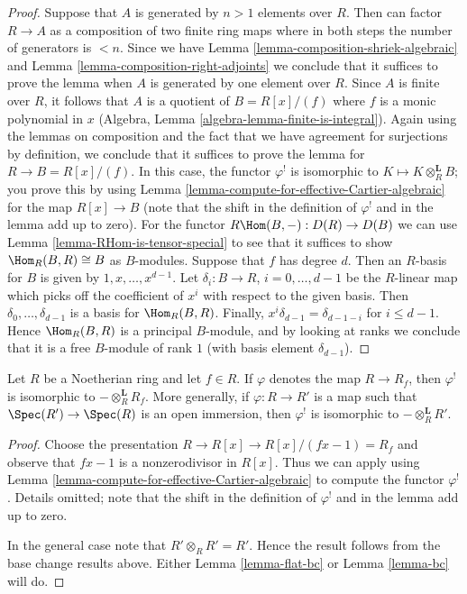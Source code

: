 \begin{proof}
Suppose that $A$ is generated by $n > 1$ elements over $R$.
Then can factor $R \to A$ as a composition of two finite ring maps
where in both steps the number of generators is $< n$.
Since we have Lemma \ref{lemma-composition-shriek-algebraic} and
Lemma \ref{lemma-composition-right-adjoints}
we conclude that it suffices
to prove the lemma when $A$ is generated by one element over $R$.
Since $A$ is finite over $R$, it follows that $A$ is a quotient
of $B = R[x]/(f)$ where $f$ is a monic polynomial in $x$
(Algebra, Lemma \ref{algebra-lemma-finite-is-integral}).
Again using the lemmas on composition and the fact that we
have agreement for surjections by definition, we conclude that
it suffices to prove the lemma for $R \to B = R[x]/(f)$.
In this case, the functor $\varphi^!$ is isomorphic to
$K \mapsto K \otimes_R^\mathbf{L} B$; you prove this by
using Lemma \ref{lemma-compute-for-effective-Cartier-algebraic}
for the map $R[x] \to B$ (note that the shift in the definition
of $\varphi^!$ and in the lemma add up to zero).
For the functor $R\Hom(B, -) : D(R) \to D(B)$ we can use
Lemma \ref{lemma-RHom-is-tensor-special}
to see that it suffices to show $\Hom_R(B, R) \cong B$
as $B$-modules. Suppose that $f$ has degree $d$.
Then an $R$-basis for $B$ is given by $1, x, \ldots, x^{d - 1}$.
Let $\delta_i : B \to R$, $i = 0, \ldots, d - 1$
be the $R$-linear map which picks off the coefficient
of $x^i$ with respect to the given basis. Then
$\delta_0, \ldots, \delta_{d - 1}$ is a basis for $\Hom_R(B, R)$.
Finally, $x^i \delta_{d - 1} = \delta_{d - 1 - i}$ for $i \leq d - 1$.
Hence $\Hom_R(B, R)$ is a principal $B$-module, and by looking
at ranks we conclude that it is a free $B$-module of rank $1$
(with basis element $\delta_{d - 1}$).
\end{proof}

\begin{lemma}
\label{lemma-upper-shriek-localize}
Let $R$ be a Noetherian ring and let $f \in R$.
If $\varphi$ denotes the map $R \to R_f$, then $\varphi^!$
is isomorphic to $- \otimes_R^\mathbf{L} R_f$.
More generally, if $\varphi : R \to R'$ is a map such that
$\Spec(R') \to \Spec(R)$ is an open immersion, then
$\varphi^!$ is isomorphic to $- \otimes_R^\mathbf{L} R'$.
\end{lemma}

\begin{proof}
Choose the presentation $R \to R[x] \to R[x]/(fx - 1) = R_f$ and observe
that $fx - 1$ is a nonzerodivisor in $R[x]$. Thus we can apply
using Lemma \ref{lemma-compute-for-effective-Cartier-algebraic}
to compute the functor $\varphi^!$. Details omitted;
note that the shift in the definition
of $\varphi^!$ and in the lemma add up to zero.

\medskip\noindent
In the general case note that $R' \otimes_R R' = R'$.
Hence the result follows from the base change results
above. Either Lemma \ref{lemma-flat-bc} or
Lemma \ref{lemma-bc} will do.
\end{proof}

